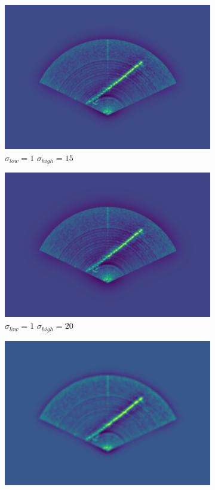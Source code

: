 \begin{figure}[H]
\begin{subfigure}[b]{.32\textwidth}
        \includegraphics[width=\textwidth]{figures/bandpassing/1_15.png}
        \caption{\(\sigma_{low} = 1\) \(\sigma_{high} = 15\)}
    \end{subfigure}
    \hfill
    \begin{subfigure}[b]{.32\textwidth}
        \centering
        \includegraphics[width=\textwidth]{figures/bandpassing/1_20.png}
        \caption{\(\sigma_{low} = 1\) \(\sigma_{high} = 20\)}
    \end{subfigure}
    \hfill
    \begin{subfigure}[b]{.32\textwidth}
        \centering
        \includegraphics[width=\textwidth]{figures/bandpassing/2_10.png}

\end{subfigure}
\end{figure}
